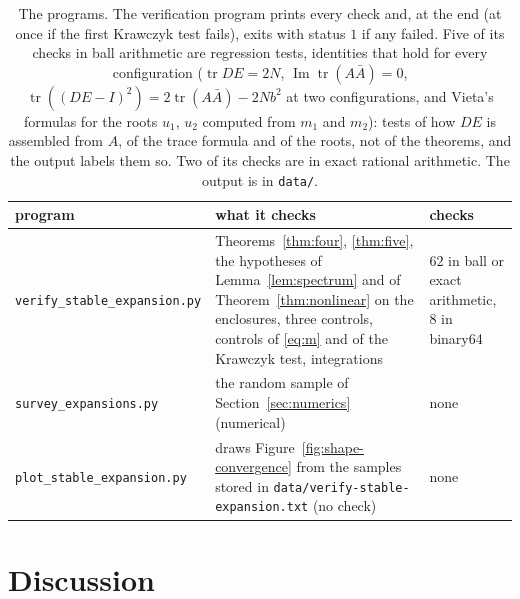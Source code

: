 \documentclass[11pt]{article}
\theoremstyle{definition}
\newcommand{\im}{\operatorname{Im}}
\newcommand{\tr}{\operatorname{tr}}
\begin{document}
\begin{table}[t]
\centering
\small
\begin{tabular}{@{}>{\raggedright\arraybackslash}p{}>{\raggedright\arraybackslash}p{}>{\raggedright\arraybackslash}p{}@{}}
\toprule
program & what it checks & checks \\
\midrule
\texttt{verify\_\allowbreak stable\_\allowbreak expansion.py} & Theorems~\ref{thm:four}, \ref{thm:five}, the hypotheses of Lemma~\ref{lem:spectrum} and of Theorem~\ref{thm:nonlinear} on the enclosures, three controls, controls of \eqref{eq:m} and of the Krawczyk test, integrations & $62$ in ball or exact arithmetic, $8$ in binary64 \\
\texttt{survey\_\allowbreak expansions.py} & the random sample of Section~\ref{sec:numerics} (numerical) & none \\
\texttt{plot\_\allowbreak stable\_\allowbreak expansion.py} & draws Figure~\ref{fig:shape-convergence} from the samples stored in \texttt{data/\allowbreak verify-\allowbreak stable-\allowbreak expansion.txt} (no check) & none \\
\bottomrule
\end{tabular}
\caption{The programs. The verification program prints every check and, at the end (at once if the first Krawczyk test fails), exits with status $1$ if any failed. Five of its checks in ball arithmetic are regression tests, identities that hold for every configuration ($\tr DE = 2N$, $\im\tr(A\bar A) = 0$, $\tr((DE - I)^2) = 2\tr(A\bar A) - 2Nb^2$ at two configurations, and Vieta's formulas for the roots $u_1$, $u_2$ computed from $m_1$ and $m_2$): tests of how $DE$ is assembled from $A$, of the trace formula and of the roots, not of the theorems, and the output labels them so. Two of its checks are in exact rational arithmetic. The output is in \texttt{data/}.}\label{tab:programs}
\end{table}

\section{Discussion}\label{sec:discussion}
\end{document}
